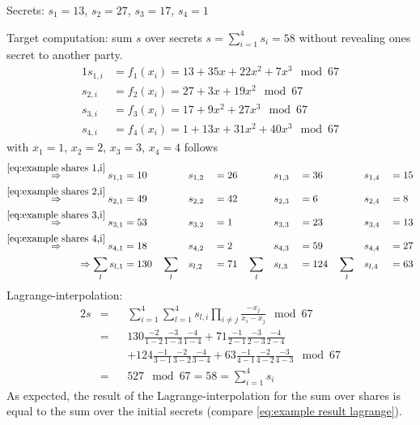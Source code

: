 		\noindent Secrets: $s_1=13$, $s_2=27$, $s_3=17$, $s_4=1$\par
		
		\noindent Target computation: sum $s$ over secrets $s= \sum_{i=1}^4 s_i=58$ without revealing ones secret to another party.		
		\begin{alignat}{1}
			s_{1,i}&=f_1(x_i)=13 + 35x + 22x^2 + 7x^3 \mod 67 \label{eq:example shares 1,i} \\
			s_{2,i}&=f_2(x_i)=27 + 3x + 19x^2 \mod 67 \label{eq:example shares 2,i} \\
			s_{3,i}&=f_3(x_i)=17 + 9x^2 + 27x^3 \mod 67 \label{eq:example shares 3,i} \\
			s_{4,i}&=f_4(x_i)=1 + 13x + 31x^2 + 40x^3 \mod 67 \label{eq:example shares 4,i}
		\end{alignat}
		with $x_1=1$, $x_2=2$, $x_3=3$, $x_4=4$ follows
		\begin{alignat}{7}
		 \overset{\ref{eq:example shares 1,i}}{\Rightarrow} s_{1,1}&=10 \quad &&s_{1,2}&&=26 \quad &&s_{1,3}&&=36 \quad  &&s_{1,4}&&=15  \nonumber \\
		\overset{\ref{eq:example shares 2,i}}{\Rightarrow} s_{2,1}&=49 \quad &&s_{2,2}&&=42 \quad &&s_{2,3}&&=6 \quad &&s_{2,4}&&=8  \nonumber \\
		\overset{\ref{eq:example shares 3,i}}{\Rightarrow} s_{3,1}&=53 \quad &&s_{3,2}&&=1 \quad &&s_{3,3}&&=23 \quad &&s_{3,4}&&=13  \nonumber \\
		\overset{\ref{eq:example shares 4,i}}{\Rightarrow} s_{4,1}&=18 \quad &&s_{4,2}&&=2 \quad &&s_{4,3}&&=59 \quad &&s_{4,4}&&=27 \nonumber \\
		\Rightarrow \sum_l s_{l,1}&=130 \quad \sum_l && s_{l,2}&&=71 \quad \sum_l && s_{l,3}&&=124 \quad \sum_l && s_{l,4}&&=63 \nonumber		
		\end{alignat}
		Lagrange-interpolation:
		\begin{alignat}{2}
		s&= &&\sum_{i=1}^{4}\sum_{l=1}^{4}s_{l,i}\prod_{i \neq j} \frac{-x_j}{x_i-x_j}\mod 67 \nonumber \\
		 &= &&130\frac{-2}{1-2}\frac{-3}{1-3}\frac{-4}{1-4}+71\frac{-1}{2-1}\frac{-3}{2-3}\frac{-4}{2-4} \nonumber \\
		 & &&+124\frac{-1}{3-1}\frac{-2}{3-2}\frac{-4}{3-4}+63\frac{-1}{4-1}\frac{-2}{4-2}\frac{-3}{4-3}\mod 67 \nonumber \\
		 &=&& 527 \mod 67 = 58 = \sum_{i=1}^4 s_i \label{eq:example result lagrange}
		\end{alignat}
		As expected, the result of the Lagrange-interpolation for the sum over shares is equal to the sum over the initial secrets (compare \ref{eq:example result lagrange}).
		
